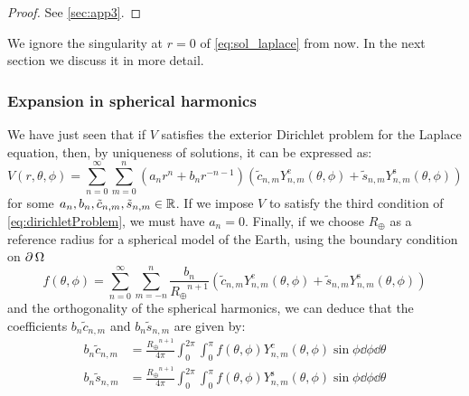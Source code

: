 \documentclass[../main.tex]{subfiles}
\begin{document}
\begin{proof}
  See \cref{sec:app3}.
\end{proof}
We ignore the singularity at $r=0$ of \cref{eq:sol_laplace} from now. In the next section we discuss it in more detail.
\subsubsection{Expansion in spherical harmonics}\label{sec:laplace_spherical_potential}
We have just seen that if $V$ satisfies the exterior Dirichlet problem for the Laplace equation, then, by uniqueness of solutions, it can be expressed as:
\begin{equation}\label{eq:prePotential}
  V(r,\theta,\phi) = \sum_{n=0}^\infty \sum_{m=0}^n (a_n r^{n} +b_{n}r^{-n-1})(\tilde{c}_{n,m}Y_{n,m}^{\mathrm{c}}(\theta,\phi)+\tilde{s}_{n,m}Y_{n,m}^{\mathrm{s}}(\theta,\phi))
\end{equation}
for some $a_n,b_n,\tilde{c}_{n,m},\tilde{s}_{n,m}\in\mathbb{R}$. If we impose $V$ to satisfy the third condition of \cref{eq:dirichletProblem}, we must have $a_{n}=0$.
Finally, if we choose $R_\oplus$ as a reference radius for a spherical model of the Earth, using the boundary condition on $\operatorname{\partial}{\Omega}$
\begin{equation}
  f(\theta,\phi) = \sum_{n=0}^\infty \sum_{m=-n}^n \frac{b_{n}}{{R_\oplus}^{n+1}}(\tilde{c}_{n,m}Y_{n,m}^{\mathrm{c}}(\theta,\phi)+\tilde{s}_{n,m}Y_{n,m}^{\mathrm{s}}(\theta,\phi))
\end{equation}
and the orthogonality of the spherical harmonics, we can deduce that the coefficients $b_n\tilde{c}_{n,m}$ and $b_n\tilde{s}_{n,m}$ are given by:
\begin{align}
  b_n\tilde{c}_{n,m} & =\frac{{R_\oplus}^{n+1}}{4\pi}\int_0^{2\pi}\int_0^\pi f(\theta,\phi) Y_{n,m}^\mathrm{c}(\theta,\phi)\sin\phi\dd{\phi}\dd{\theta} \\
  b_n\tilde{s}_{n,m} & =\frac{{R_\oplus}^{n+1}}{4\pi}\int_0^{2\pi}\int_0^\pi f(\theta,\phi) Y_{n,m}^\mathrm{s}(\theta,\phi)\sin\phi\dd{\phi}\dd{\theta}
\end{align}
\end{document}

